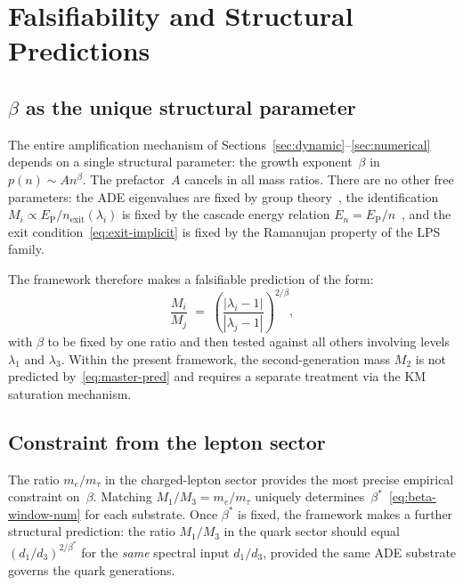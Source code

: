\documentclass[11pt,a4paper]{article}
\newcommand{\nexit}{n_{\mathrm{exit}}}
\newcommand{\EP}{E_{\mathrm{P}}}
\begin{document}
  \section{Falsifiability and Structural Predictions}
    \label{sec:falsifiability}

    \subsection{$\beta$ as the unique structural parameter}
      \label{subsec:beta-unique}

      The entire amplification mechanism of Sections~\ref{sec:dynamic}--\ref{sec:numerical}
      depends on a single structural parameter: the growth exponent~$\beta$ in
      $p(n) \sim A n^{\beta}$.
      The prefactor~$A$ cancels in all mass ratios.
      There are no other free parameters:
      the ADE eigenvalues are fixed by group theory~\cite{Beau2026a4},
      the identification $M_i \propto \EP/\nexit(\lambda_i)$ is fixed by
      the cascade energy relation $E_n = \EP/n$~\cite{Beau2026a5},
      and the exit condition~\eqref{eq:exit-implicit} is fixed by the Ramanujan
      property of the LPS family.

      The framework therefore makes a falsifiable prediction of the form:
      \begin{equation}
        \label{eq:master-pred}
        \frac{M_i}{M_j}
        \;=\;
        \left(\frac{|\lambda_i - 1|}{|\lambda_j - 1|}\right)^{2/\beta},
      \end{equation}
      with $\beta$ to be fixed by one ratio and then tested against all others
      involving levels $\lambda_1$ and $\lambda_3$.
      Within the present framework, the second-generation mass $M_2$ is not
      predicted by~\eqref{eq:master-pred} and requires a separate treatment
      via the KM saturation mechanism.

    \subsection{Constraint from the lepton sector}
      \label{subsec:lepton-constraint}

      The ratio $m_e/m_\tau$ in the charged-lepton sector provides the
      most precise empirical constraint on~$\beta$.
      Matching $M_1/M_3 = m_e/m_\tau$ uniquely
      determines~$\beta^{*}$~\eqref{eq:beta-window-num} for each substrate.
      Once $\beta^{*}$ is fixed, the framework makes a further structural
      prediction: the ratio $M_1/M_3$ in the quark sector should equal
      $(d_1/d_3)^{2/\beta^*}$ for the \emph{same} spectral input $d_1/d_3$,
      provided the same ADE substrate governs the quark generations.
\end{document}

